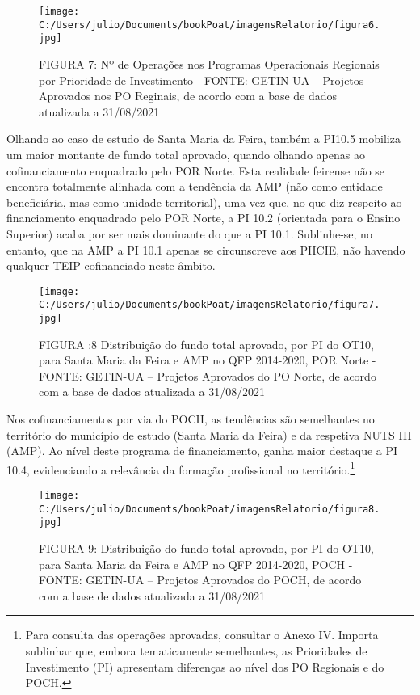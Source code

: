\documentclass[
]{book}
\begin{document}
\begin{figure}
\centering
\texttt{[image: C:/Users/julio/Documents/bookPoat/imagensRelatorio/figura6.jpg]}
\caption{FIGURA 7: Nº de Operações nos Programas Operacionais Regionais por Prioridade de Investimento - FONTE: GETIN-UA -- Projetos Aprovados nos PO Reginais, de acordo com a base de dados atualizada a 31/08/2021}
\end{figure}

Olhando ao caso de estudo de Santa Maria da Feira, também a PI10.5 mobiliza um maior montante de fundo total aprovado, quando olhando apenas ao cofinanciamento enquadrado pelo POR Norte. Esta realidade feirense não se encontra totalmente alinhada com a tendência da AMP (não como entidade beneficiária, mas como unidade territorial), uma vez que, no que diz respeito ao financiamento enquadrado pelo POR Norte, a PI 10.2 (orientada para o Ensino Superior) acaba por ser mais dominante do que a PI 10.1. Sublinhe-se, no entanto, que na AMP a PI 10.1 apenas se circunscreve aos PIICIE, não havendo qualquer TEIP cofinanciado neste âmbito.

\begin{figure}
\centering
\texttt{[image: C:/Users/julio/Documents/bookPoat/imagensRelatorio/figura7.jpg]}
\caption{FIGURA :8 Distribuição do fundo total aprovado, por PI do OT10, para Santa Maria da Feira e AMP no QFP 2014-2020, POR Norte - FONTE: GETIN-UA -- Projetos Aprovados do PO Norte, de acordo com a base de dados atualizada a 31/08/2021}
\end{figure}

Nos cofinanciamentos por via do POCH, as tendências são semelhantes no território do município de estudo (Santa Maria da Feira) e da respetiva NUTS III (AMP). Ao nível deste programa de financiamento, ganha maior destaque a PI 10.4, evidenciando a relevância da formação profissional no território.\footnote{Para consulta das operações aprovadas, consultar o Anexo IV.
  Importa sublinhar que, embora tematicamente semelhantes, as Prioridades de Investimento (PI) apresentam diferenças ao nível dos PO Regionais e do POCH.}

\begin{figure}
\centering
\texttt{[image: C:/Users/julio/Documents/bookPoat/imagensRelatorio/figura8.jpg]}
\caption{FIGURA 9: Distribuição do fundo total aprovado, por PI do OT10, para Santa Maria da Feira e AMP no QFP 2014-2020, POCH - FONTE: GETIN-UA -- Projetos Aprovados do POCH, de acordo com a base de dados atualizada a 31/08/2021}
\end{figure}
\end{document}
